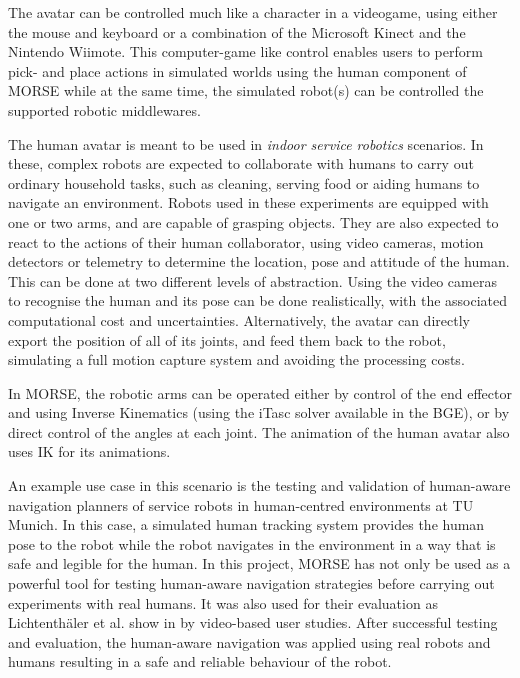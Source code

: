 \documentclass{llncs}
\begin{document}
The avatar can be controlled much like a character in a videogame, using either
the mouse and keyboard or a combination of the Microsoft Kinect and the
Nintendo Wiimote. This computer-game like control enables users to perform
pick- and place actions in simulated worlds using the human component of MORSE
while at the same time, the simulated robot(s) can be controlled the supported
robotic middlewares.


The human avatar is meant to be used in \emph{indoor service robotics} scenarios.
In these, complex robots are expected to collaborate with humans to carry out
ordinary household tasks, such as cleaning, serving food or aiding humans to
navigate an environment.
Robots used in these experiments are equipped with one or two arms, and are
capable of grasping objects. They are also expected to react to the actions of
their human collaborator, using video cameras, motion detectors or telemetry to
determine the location, pose and attitude of the human.
This can be done at two different levels of
abstraction. Using the video cameras to recognise the human and its pose can be
done realistically, with the associated computational cost and uncertainties.
Alternatively, the avatar can directly export the position of all of its
joints, and feed them back to the robot, simulating a full motion capture
system and avoiding the processing costs.


In MORSE, the robotic arms can be operated either by control of the end
effector and using Inverse Kinematics (using the iTasc \cite{iTaSC} solver
available in the BGE), or by direct control of the angles at each joint.
The animation of the human avatar also uses IK for its animations.

An example use case in this scenario is the testing and validation of human-aware
navigation planners of service robots in human-centred environments at TU Munich. 
In this case, a simulated human tracking system provides the human pose to the robot
while the robot navigates in the environment in a way that is safe and legible
for the human. In this project, MORSE has not only be used as a powerful tool 
for testing human-aware navigation strategies before carrying out experiments
with real humans. It was also used for their evaluation as 
Lichtenth{\"a}ler et al. show in \cite{lichtenthaeler2012increasing} by 
video-based user studies. After successful testing and evaluation, the 
human-aware navigation was applied using real robots and humans resulting in 
a safe and reliable behaviour of the robot.
\end{document}
